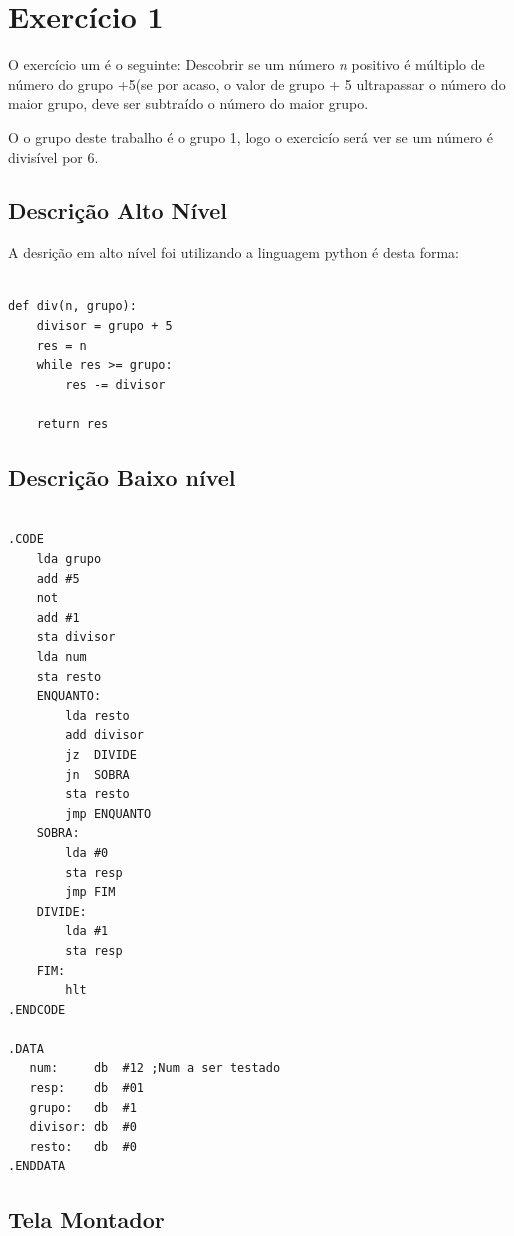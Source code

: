\section{Exercício 1}

O exercício um é o seguinte: Descobrir se um número \emph{n} positivo é múltiplo
de número do grupo +5(se por acaso, o valor de grupo + 5 ultrapassar o número do
maior grupo, deve ser subtraído o número do maior grupo.

O o grupo deste trabalho é o grupo 1, logo o exercicío será ver se um número é
divisível por 6.

\subsection{Descrição Alto Nível}

A desrição em alto nível foi utilizando a linguagem python é desta forma:

\begin{lstlisting}

def div(n, grupo):
    divisor = grupo + 5
    res = n
    while res >= grupo:
        res -= divisor
    
    return res

\end{lstlisting}

\subsection{Descrição Baixo nível}
\begin{verbatim}
    
.CODE
    lda grupo
    add #5
    not
    add #1
    sta divisor
    lda num
    sta resto
    ENQUANTO:
        lda resto
        add divisor
        jz  DIVIDE 
        jn  SOBRA
        sta resto
        jmp ENQUANTO
    SOBRA:
        lda #0
        sta resp
        jmp FIM
    DIVIDE:
        lda #1
        sta resp        
    FIM:
        hlt
.ENDCODE

.DATA
   num:     db  #12 ;Num a ser testado 
   resp:    db  #01
   grupo:   db  #1
   divisor: db  #0
   resto:   db  #0
.ENDDATA
\end{verbatim}

\subsection{Tela Montador}

